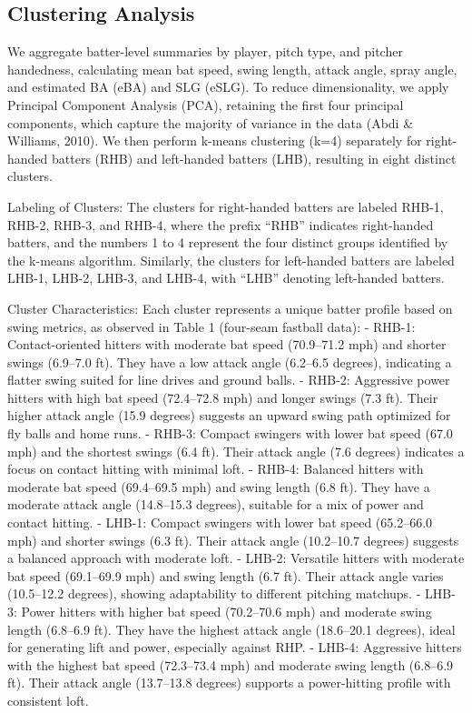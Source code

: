 \documentclass[
]{article}
\begin{document}
\hypertarget{clustering-analysis}{%
\subsection{Clustering Analysis}\label{clustering-analysis}}

We aggregate batter-level summaries by player, pitch type, and pitcher
handedness, calculating mean bat speed, swing length, attack angle,
spray angle, and estimated BA (eBA) and SLG (eSLG). To reduce
dimensionality, we apply Principal Component Analysis (PCA), retaining
the first four principal components, which capture the majority of
variance in the data (Abdi \& Williams, 2010). We then perform k-means
clustering (k=4) separately for right-handed batters (RHB) and
left-handed batters (LHB), resulting in eight distinct clusters.

Labeling of Clusters: The clusters for right-handed batters are labeled
RHB-1, RHB-2, RHB-3, and RHB-4, where the prefix ``RHB'' indicates
right-handed batters, and the numbers 1 to 4 represent the four distinct
groups identified by the k-means algorithm. Similarly, the clusters for
left-handed batters are labeled LHB-1, LHB-2, LHB-3, and LHB-4, with
``LHB'' denoting left-handed batters.

Cluster Characteristics: Each cluster represents a unique batter profile
based on swing metrics, as observed in Table 1 (four-seam fastball
data): - RHB-1: Contact-oriented hitters with moderate bat speed
(70.9--71.2 mph) and shorter swings (6.9--7.0 ft). They have a low
attack angle (6.2--6.5 degrees), indicating a flatter swing suited for
line drives and ground balls. - RHB-2: Aggressive power hitters with
high bat speed (72.4--72.8 mph) and longer swings (7.3 ft). Their higher
attack angle (15.9 degrees) suggests an upward swing path optimized for
fly balls and home runs. - RHB-3: Compact swingers with lower bat speed
(67.0 mph) and the shortest swings (6.4 ft). Their attack angle (7.6
degrees) indicates a focus on contact hitting with minimal loft. -
RHB-4: Balanced hitters with moderate bat speed (69.4--69.5 mph) and
swing length (6.8 ft). They have a moderate attack angle (14.8--15.3
degrees), suitable for a mix of power and contact hitting. - LHB-1:
Compact swingers with lower bat speed (65.2--66.0 mph) and shorter
swings (6.3 ft). Their attack angle (10.2--10.7 degrees) suggests a
balanced approach with moderate loft. - LHB-2: Versatile hitters with
moderate bat speed (69.1--69.9 mph) and swing length (6.7 ft). Their
attack angle varies (10.5--12.2 degrees), showing adaptability to
different pitching matchups. - LHB-3: Power hitters with higher bat
speed (70.2--70.6 mph) and moderate swing length (6.8--6.9 ft). They
have the highest attack angle (18.6--20.1 degrees), ideal for generating
lift and power, especially against RHP. - LHB-4: Aggressive hitters with
the highest bat speed (72.3--73.4 mph) and moderate swing length
(6.8--6.9 ft). Their attack angle (13.7--13.8 degrees) supports a
power-hitting profile with consistent loft.
\end{document}
